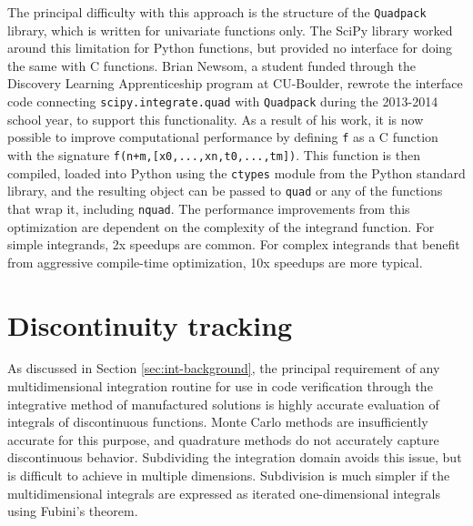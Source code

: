 The principal difficulty with this approach is the structure of the {\tt Quadpack} library, which is written for univariate functions only. The SciPy library worked around this limitation for Python functions, but provided no interface for doing the same with C functions. Brian Newsom, a student funded through the Discovery Learning Apprenticeship program at CU-Boulder, rewrote the interface code connecting {\tt scipy.integrate.quad} with {\tt Quadpack} during the 2013-2014 school year, to support this functionality. As a result of his work, it is now possible to improve computational performance by defining {\tt f} as a C function with the signature {\tt f(n+m,[x0,...,xn,t0,...,tm])}. This function is then compiled, loaded into Python using the {\tt ctypes} module from the Python standard library, and the resulting object can be passed to {\tt quad} or any of the functions that wrap it, including {\tt nquad}. The performance improvements from this optimization are dependent on the complexity of the integrand function. For simple integrands, 2x speedups are common. For complex integrands that benefit from aggressive compile-time optimization, 10x speedups are more typical.

\section{Discontinuity tracking}
\label{sec:int-disc-tracking}

As discussed in Section \ref{sec:int-background}, the principal requirement of any multidimensional integration routine for use in code verification through the integrative method of manufactured solutions is highly accurate evaluation of integrals of discontinuous functions. Monte Carlo methods are insufficiently accurate for this purpose, and quadrature methods do not accurately capture discontinuous behavior. Subdividing the integration domain avoids this issue, but is difficult to achieve in multiple dimensions. Subdivision is much simpler if the multidimensional integrals are expressed as iterated one-dimensional integrals using Fubini's theorem. 

